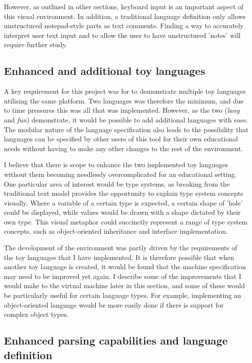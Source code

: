 However, as outlined in other sections, keyboard input is an important aspect of this visual environment. In addition, a traditional language definition only allows unstructured notepad-style parts as text comments. Finding a way to accurately interpret user text input and to allow the user to have unstructured 'notes' will require further study.

\subsection{Enhanced and additional toy languages}

A key requirement for this project was for to demonstrate multiple toy languages utilising the same platform. Two languages was therefore the minimum, and due to time pressures this was all that was implemented. However, as the two (\textit{lang} and \textit{fun}) demonstrate, it would be possible to add additional languages with ease. The modular nature of the language specification also leads to the possibility that languages can be specified by other users of this tool for their own educational needs without having to make any other changes to the rest of the environment.

I believe that there is scope to enhance the two implemented toy languages without them becoming needlessly overcomplicated for an educational setting. One particular area of interest would be type systems, as breaking from the traditional text model provides the opportunity to explain type system concepts visually. Where a variable of a certain type is expected, a certain shape of 'hole' could be displayed, while values would be drawn with a shape dictated by their own type. This visual metaphor could succinctly represent a range of type system concepts, such as object-oriented inheritance and interface implementation.

The development of the environment was partly driven by the requirements of the toy languages that I have implemented. It is therefore possible that when another toy language is created, it would be found that the machine specification may need to be improved yet again. I describe some of the improvements that I would make to the virtual machine later in this section, and some of these would be particularly useful for certain language types. For example, implementing an object-oriented language would be more easily done if there is support for complex object types.

\subsection{Enhanced parsing capabilities and language definition}


